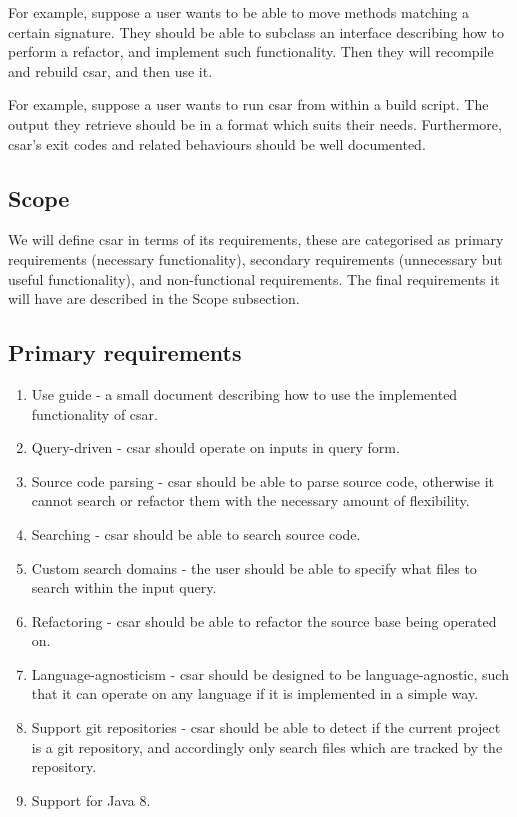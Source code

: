 \documentclass[12pt, letterpaper]{article}
\begin{document}
For example, suppose a user wants to be able to move methods matching a certain signature.
They should be able to subclass an interface describing how to perform a refactor, and implement such functionality.
Then they will recompile and rebuild csar, and then use it.

For example, suppose a user wants to run csar from within a build script.
The output they retrieve should be in a format which suits their needs.
Furthermore, csar's exit codes and related behaviours should be well documented.

\subsection{Scope}
We will define csar in terms of its requirements, these are categorised as primary requirements (necessary functionality), secondary requirements (unnecessary but useful functionality), and non-functional requirements.
The final requirements it will have are described in the Scope subsection.

\subsection{Primary requirements}
\label{sec:PrimaryRequirements}
\begin{enumerate}
  \item Use guide - a small document describing how to use the implemented functionality of csar.
  \item Query-driven - csar should operate on inputs in query form.
  \item Source code parsing - csar should be able to parse source code, otherwise it cannot search or refactor them with the necessary amount of flexibility.
  \item Searching - csar should be able to search source code.
  \item Custom search domains - the user should be able to specify what files to search within the input query.
  \item Refactoring - csar should be able to refactor the source base being operated on.
  \item Language-agnosticism - csar should be designed to be language-agnostic, such that it can operate on any language if it is implemented in a simple way.
  \item Support git repositories - csar should be able to detect if the current project is a git repository, and accordingly only search files which are tracked by the repository.
  \item Support for Java 8.
\end{enumerate}
\end{document}

